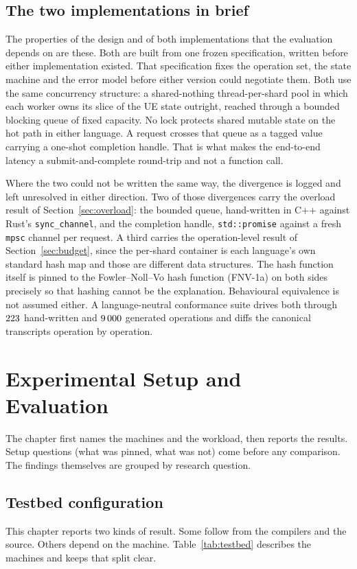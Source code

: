 \documentclass[english,oneside,a4paper,censored,csm,software-track-2020]{HYthesisML}
\begin{document}
\section{The two implementations in brief}\label{sec:designbrief}
The properties of the design and of both implementations that the evaluation depends on are
these. Both are built from one frozen specification, written before either implementation
existed. That specification fixes the operation set, the state machine and the error model
before either version could negotiate them. Both use the same concurrency structure: a
shared-nothing thread-per-shard pool in which each worker owns its slice of the UE state
outright, reached through a bounded blocking queue of fixed capacity. No lock protects shared
mutable state on the hot path in either language. A request crosses that queue as a tagged value
carrying a one-shot completion handle. That is what makes the end-to-end latency a
submit-and-complete round-trip and not a function call.

Where the two could not be written the same way, the divergence is logged and left unresolved
in either direction. Two of those divergences carry the overload result of
Section~\ref{sec:overload}: the bounded queue, hand-written in C++ against Rust's
\texttt{sync\_channel}, and the completion handle, \texttt{std::promise} against a fresh
\texttt{mpsc} channel per request. A third carries the operation-level result of
Section~\ref{sec:budget}, since the per-shard container is each language's own standard hash map
and those are different data structures. The hash function itself is pinned to the
Fowler--Noll--Vo hash function (FNV-1a) on both sides precisely so that hashing cannot be the
explanation. Behavioural equivalence is not assumed either. A language-neutral conformance
suite drives both through $223$ hand-written and $9\,000$ generated operations
and diffs the canonical transcripts operation by operation.

\chapter{Experimental Setup and Evaluation\label{chapter:eval}}

The chapter first names the machines and the workload, then reports the results. Setup
questions (what was pinned, what was not) come before any comparison. The findings themselves
are grouped by research question.

\section{Testbed configuration\label{sec:testbed}}
This chapter reports two kinds of result. Some follow from the compilers and the source. Others
depend on the machine. Table~\ref{tab:testbed} describes the machines and keeps that split clear.
\end{document}
